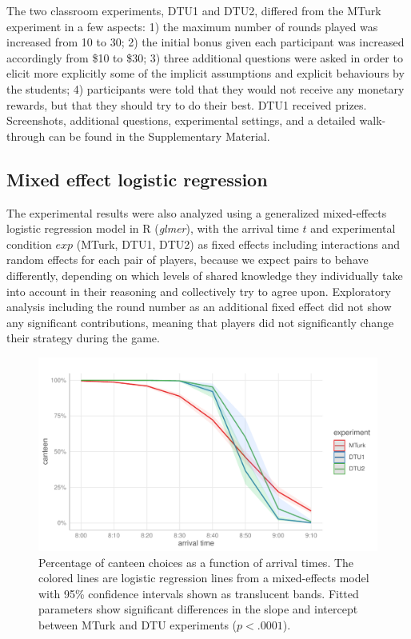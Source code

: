 \documentclass[twocolumn,a4paper,superscriptaddress,nofootinbib]{revtex4}
\begin{document}
The two classroom experiments, DTU1 and DTU2, differed from the MTurk experiment in a few aspects: 1) the maximum number of rounds played was increased from 10 to 30; 2) the initial bonus given each participant was increased accordingly from \$10 to \$30; 3) three additional questions were asked in order to elicit more explicitly some of the implicit assumptions and explicit behaviours by the students; 4) participants were told that they would not receive any monetary rewards, but that they should try to do their best. DTU1 received prizes. Screenshots, additional questions, experimental settings, and a detailed walk-through can be found in the Supplementary Material.

\subsection{Mixed effect logistic regression} \label{appendix:logistic} 
The experimental results were also analyzed using a generalized mixed-effects logistic regression model in R (\emph{glmer}), with the arrival time $t$ and experimental condition $exp$ (MTurk, DTU1, DTU2) as fixed effects including interactions and random effects for each pair of players, because we expect pairs to behave differently, depending on which levels of shared knowledge they individually take into account in their reasoning and collectively try to agree upon. Exploratory analysis including the round number as an additional fixed effect did not show any significant contributions, meaning that players did not significantly change their strategy during the game. %

\begin{figure} %
	\centering\includegraphics[width=0.8\linewidth]{fig1_regression}
	\caption{Percentage of canteen choices as a function of arrival times. The colored lines are logistic regression lines from a mixed-effects model with 95\% confidence intervals shown as translucent bands. Fitted parameters show significant differences in the slope and intercept between MTurk and DTU experiments ($p < .0001$).}
	\label{fig:mx}
\end{figure}
\end{document}
